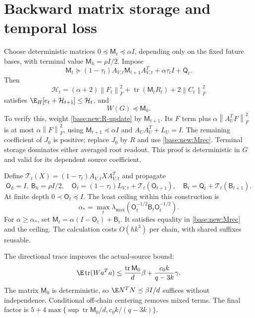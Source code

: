 \documentclass[11pt,oneside,openany,a4paper]{book}
\numberwithin{equation}{chapter}
\theoremstyle{definition}
\theoremstyle{remark}
\newcommand{\F}[1]{\left\lVert#1\right\rVert_F}
\DeclareMathOperator{\tr}{tr}\DeclareMathOperator{\rank}{rank}
\begin{document}
\section{Backward matrix storage and temporal loss}\label{base:new:matrix-storage}
Choose deterministic matrices $0\preceq\mathsf M_t\preceq\alpha I$, depending only on the fixed future bases, with terminal value $\mathsf M_h=\rho I/2$. Impose
\begin{equation}\label{base:new:Mrec}
 \mathsf M_t\succeq(1-\tau_t)A_{V,t}\mathsf M_{t+1}A_{V,t}^T
 +\alpha\tau_tI+\mathsf Q_t.
\end{equation}
Then
\[
 \mathcal H_t=(\alpha+2)\F{F_t}^2+\tr(\mathsf M_tR_t)+2\F{C_t}^2
\]
satisfies $\E_H[e_t+\mathcal H_{t+1}]\le\mathcal H_t$, and
\begin{equation}\label{base:new:Mbound}
 W(G)\preceq\mathsf M_0.
\end{equation}
To verify this, weight \eqref{base:new:R-update} by $\mathsf M_{t+1}$. Its $F$ term plus $\alpha\F{A_U^TF}^2$ is at most $\alpha\F F^2$, using $\mathsf M_{t+1}\preceq\alpha I$ and $A_UA_U^T+L_U=I$. The remaining coefficient of $J_0$ is positive; replace $J_0$ by $R$ and use \eqref{base:new:Mrec}. Terminal storage dominates either averaged root readout. This proof is deterministic in $G$ and valid for its dependent source coefficient.

Define $\mathcal T_t(X)=(1-\tau_t)A_{V,t}XA_{V,t}^T$ and propagate
\begin{equation}\label{base:new:OB}
 \mathsf O_h=I,\ \mathsf B_h=\rho I/2,\quad
 \mathsf O_t=(1-\tau_t)L_{V,t}+\mathcal T_t(\mathsf O_{t+1}),\quad
 \mathsf B_t=\mathsf Q_t+\mathcal T_t(\mathsf B_{t+1}).
\end{equation}
At finite depth $0\prec\mathsf O_t\preceq I$. The least ceiling within this construction is
\[
 \alpha_*=
 \max_t\lambda_{\max}(\mathsf O_t^{-1/2}\mathsf B_t\mathsf O_t^{-1/2}).
\]
For $\alpha\ge\alpha_*$, set $\mathsf M_t=\alpha(I-\mathsf O_t)+\mathsf B_t$.
It satisfies equality in \eqref{base:new:Mrec} and the ceiling. The calculation costs $O(hk^3)$ per chain, with shared suffixes reusable.

The directional trace improves the actual-source bound:
\begin{equation}\label{base:new:Mtrace}
 \E\tr(Wa^Ta)\le\frac{\tr\mathsf M_0}{d}\beta+
 \frac{c_0k}{q-3k}\gamma.
\end{equation}
The matrix $\mathsf M_0$ is deterministic, so $\E N^TN\preceq\beta I/d$ suffices without independence. Conditional off-chain centering removes mixed terms. The final factor is $5+4\max\{\sup\tr\mathsf M_0/d,c_0k/(q-3k)\}$.
\end{document}
